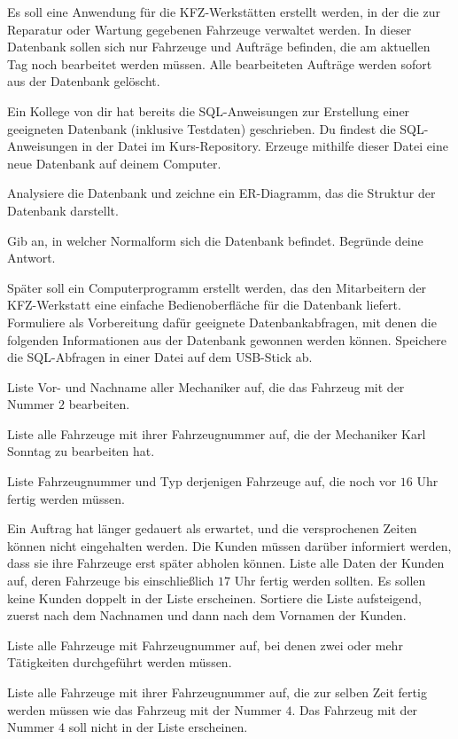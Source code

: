 Es soll eine Anwendung für die KFZ-Werkstätten erstellt werden, in der die zur
Reparatur oder Wartung gegebenen Fahrzeuge verwaltet werden. In dieser Datenbank
sollen sich nur Fahrzeuge und Aufträge befinden, die am aktuellen Tag noch
bearbeitet werden müssen. Alle bearbeiteten Aufträge werden sofort aus der
Datenbank gelöscht.

Ein Kollege von dir hat bereits die SQL-Anweisungen zur Erstellung einer
geeigneten Datenbank (inklusive Testdaten) geschrieben. Du findest die
SQL-Anweisungen in der Datei  im Kurs-Repository. Erzeuge
mithilfe dieser Datei eine neue Datenbank auf deinem Computer.

\begin{compactenum}[a)]
\item Analysiere die Datenbank und zeichne ein ER-Diagramm, das die Struktur der
Datenbank darstellt.
\item Gib an, in welcher Normalform sich die Datenbank 
befindet. Begründe deine Antwort.
\item Später soll ein Computerprogramm erstellt werden, das den Mitarbeitern der
KFZ-Werkstatt eine einfache Bedienoberfläche für die Datenbank liefert.
Formuliere als Vorbereitung dafür geeignete Datenbankabfragen, mit denen die
folgenden Informationen aus der Datenbank  gewonnen
werden können. Speichere die SQL-Abfragen in einer Datei auf dem USB-Stick ab.

\begin{compactenum}[1.]
\item Liste Vor- und Nachname aller Mechaniker auf, die das Fahrzeug mit der
Nummer $2$ bearbeiten.
\item Liste alle Fahrzeuge mit ihrer Fahrzeugnummer auf, die der Mechaniker
Karl Sonntag zu bearbeiten hat.
\item Liste Fahrzeugnummer und Typ derjenigen Fahrzeuge auf, die noch vor $16$
Uhr fertig werden müssen.
\item Ein Auftrag hat länger gedauert als erwartet, und die versprochenen Zeiten
können nicht eingehalten werden. Die Kunden müssen darüber informiert werden,
dass sie ihre Fahrzeuge erst später abholen können. Liste alle Daten der Kunden
auf, deren Fahrzeuge bis einschließlich $17$ Uhr fertig werden sollten. Es sollen
keine Kunden doppelt in der Liste erscheinen. Sortiere die Liste aufsteigend,
zuerst nach dem Nachnamen und dann nach dem Vornamen der Kunden.
\item Liste alle Fahrzeuge mit Fahrzeugnummer auf, bei denen zwei oder mehr
Tätigkeiten durchgeführt werden müssen.
\item Liste alle Fahrzeuge mit ihrer Fahrzeugnummer auf, die zur selben Zeit
fertig werden müssen wie das Fahrzeug mit der Nummer $4$. Das Fahrzeug mit der
Nummer $4$ soll nicht in der Liste erscheinen.
\end{compactenum}
\end{compactenum}


